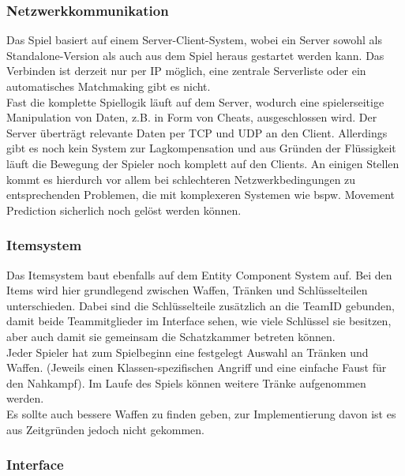 \documentclass[10pt,a4paper,notitlepage]{scrreprt}
\begin{document}
		\subsubsection{Netzwerkkommunikation}
		
		Das Spiel basiert auf einem Server-Client-System, wobei ein Server sowohl als Standalone-Version als auch aus dem Spiel heraus gestartet werden kann. Das Verbinden ist derzeit nur per IP möglich, eine zentrale Serverliste oder ein automatisches Matchmaking gibt es nicht.\\
		Fast die komplette Spiellogik läuft auf dem Server, wodurch eine spielerseitige Manipulation von Daten, z.B. in Form von Cheats, ausgeschlossen wird. Der Server überträgt relevante Daten per TCP und UDP an den Client. Allerdings gibt es noch kein System zur Lagkompensation und aus Gründen der Flüssigkeit läuft die Bewegung der Spieler noch komplett auf den Clients. An einigen Stellen kommt es hierdurch vor allem bei schlechteren Netzwerkbedingungen zu entsprechenden Problemen, die mit komplexeren Systemen wie bspw. Movement Prediction sicherlich noch gelöst werden können.\\
		
		\subsubsection{Itemsystem}
		
		Das Itemsystem baut ebenfalls auf dem Entity Component System auf. Bei den Items wird hier grundlegend zwischen Waffen, Tränken und Schlüsselteilen unterschieden. Dabei sind die Schlüsselteile zusätzlich an die TeamID gebunden, damit beide Teammitglieder im Interface sehen, wie viele Schlüssel sie besitzen, aber auch damit sie gemeinsam die Schatzkammer betreten können.\\
		Jeder Spieler hat zum Spielbeginn eine festgelegt Auswahl an Tränken und Waffen. (Jeweils einen Klassen-spezifischen Angriff und eine einfache Faust für den Nahkampf). Im Laufe des Spiels können weitere Tränke aufgenommen werden.\\
		Es sollte auch bessere Waffen zu finden geben, zur Implementierung davon ist es aus Zeitgründen jedoch nicht gekommen.\\
		
		\subsubsection{Interface}
		
\end{document}
